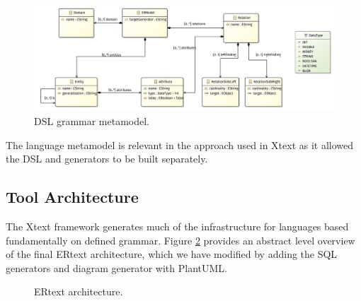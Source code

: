 \begin{figure}[!htb]
    \centering
    \caption{DSL grammar metamodel.}
    \label{fig:metamodel}
    \includegraphics[width=\textwidth]{img/erDsl_class_diagram.png}
\end{figure}

The language metamodel is relevant in the approach used in Xtext as it allowed the DSL and generators to be built separately.

\subsection{Tool Architecture}

The Xtext framework generates much of the infrastructure for languages based fundamentally on defined grammar.
Figure \ref{fig:arqERtext} provides an abstract level overview of the final ERtext architecture, which we have modified by adding the SQL generators and diagram generator with PlantUML.

\begin{figure}[!htb]
    \centering
    \caption{ERtext architecture.}
    \label{fig:arqERtext}
    
\end{figure}

